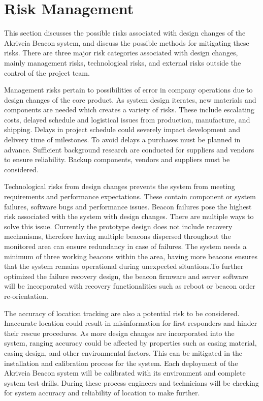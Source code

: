 

\setcounter{section}{3}
\section{Risk Management}
\bigskip
This section discusses the possible risks associated with design changes of the Akriveia Beacon system, and discuss the possible methods for mitigating these risks. There are three major risk categories associated with design changes, mainly management risks, technological risks, and external risks outside the control of the project team.

\bigskip
Management risks pertain to possibilities of error in company operations due to design changes of the core product. As system design iterates, new materials and components are needed which creates a variety of risks. These include escalating costs, delayed schedule and logistical issues from production, manufacture, and shipping. Delays in project schedule could severely impact development and delivery time of milestones. To avoid delays a purchases must be planned in advance. Sufficient background research are conducted for suppliers  and vendors to ensure reliability. Backup components, vendors and suppliers must be considered.

\bigskip
Technological risks from design changes prevents the system from meeting requirements and performance expectations. These contain component or system failures, software bugs and performance issues. Beacon failures pose the highest risk associated with the system with design changes. There are multiple ways to solve this issue. Currently the prototype design does not include recovery mechanisms, therefore having multiple beacons dispersed throughout the monitored area can ensure redundancy in case of failures. The system needs a minimum of three working beacons within the area, having more beacons ensures that the system remains operational during unexpected situations.To further optimized the failure recovery design, the beacon firmware and server software will be incorporated with recovery functionalities such as reboot or beacon order re-orientation. 

\bigskip
The accuracy of location tracking are also a potential risk to be considered. Inaccurate location could result in misinformation for first responders and hinder their rescue procedures. As more design changes are incorporated into the system, ranging accuracy could be affected by properties such as casing material, casing design, and other environmental factors. This can be mitigated in the installation and calibration process for the system. Each deployment of the Akriveia Beacon system will be calibrated with its environment and complete system test drills. During these process engineers and technicians will be checking for system accuracy and reliability of location to make further. 

